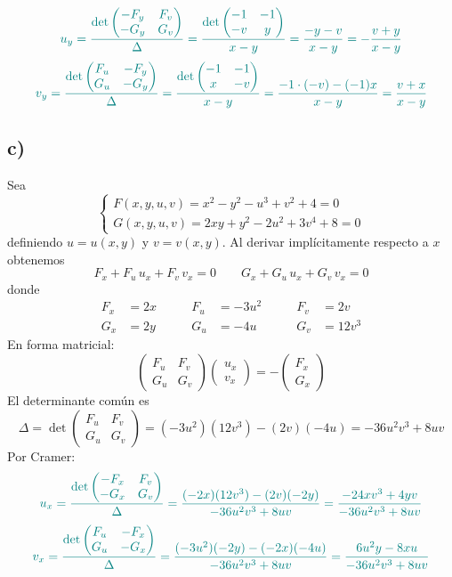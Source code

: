 \documentclass{article}
\begin{document}
\[
\color{teal}
u_y
=\frac{\det\begin{pmatrix} -F_y & F_v\\ -G_y & G_v \end{pmatrix}}{\Delta}
=\frac{\det\begin{pmatrix} -1 & -1\\ -v & y \end{pmatrix}}{x-y}
=\frac{-y - v}{x-y}
=-\frac{v+y}{x-y}
\]
\[
\color{teal}
v_y
=\frac{\det\begin{pmatrix} F_u & -F_y\\ G_u & -G_y \end{pmatrix}}{\Delta}
=\frac{\det\begin{pmatrix} -1 & -1\\ x & -v \end{pmatrix}}{x-y}
=\frac{-1\cdot(-v)-(-1)x}{x-y}
=\frac{v+x}{x-y}
\]

\subsection*{c)}

Sea
\[
\begin{cases}
F(x,y,u,v)=x^2 - y^2 - u^3 + v^2 + 4 = 0\\[4pt]
G(x,y,u,v)=2xy + y^2 - 2u^2 + 3v^4 + 8 = 0
\end{cases}
\]
definiendo \(u = u(x,y)\) y \(v = v(x,y)\). Al derivar implícitamente respecto a \(x\) obtenemos
\[
F_x + F_u\,u_x + F_v\,v_x = 0
\qquad
G_x + G_u\,u_x + G_v\,v_x = 0
\]
donde
\[
\begin{aligned}
F_x &= 2x &\qquad F_u &= -3u^2 &\qquad F_v &= 2v\\
G_x &= 2y &\qquad G_u &= -4u   &\qquad G_v &= 12v^3
\end{aligned}
\]
En forma matricial:
\[
\begin{pmatrix}
F_u & F_v\\
G_u & G_v
\end{pmatrix}
\begin{pmatrix}
u_x\\
v_x
\end{pmatrix}
=
-\begin{pmatrix}
F_x\\
G_x
\end{pmatrix}
\]
El determinante común es
\[
\Delta
= \det
\begin{pmatrix}
F_u & F_v\\
G_u & G_v
\end{pmatrix}
= (-3u^2)(12v^3) - (2v)(-4u)
= -36u^2v^3 + 8uv
\]
Por Cramer:
\[
\color{teal}
u_x
=\frac{\det\begin{pmatrix} -F_x & F_v\\ -G_x & G_v \end{pmatrix}}{\Delta}
=\frac{(-2x)(12v^3) - (2v)(-2y)}{-36u^2v^3+8uv}
=\frac{-24xv^3 + 4yv}{-36u^2v^3+8uv}
\]
\[
\color{teal}
v_x
=\frac{\det\begin{pmatrix} F_u & -F_x\\ G_u & -G_x \end{pmatrix}}{\Delta}
=\frac{(-3u^2)(-2y) - (-2x)(-4u)}{-36u^2v^3+8uv}
=\frac{6u^2y - 8xu}{-36u^2v^3+8uv}
\]
\end{document}

